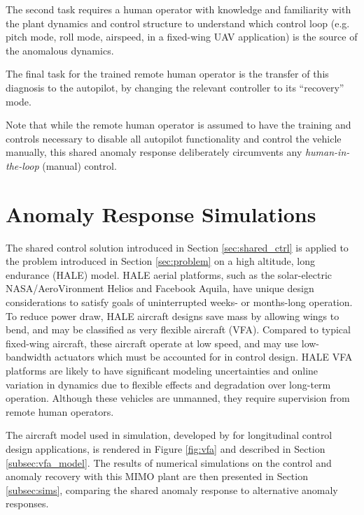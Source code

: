 \documentclass[english]{ifacconf}
\begin{document}
The second task requires a human operator with knowledge and familiarity with the plant dynamics and control structure to understand which control loop (e.g. pitch mode, roll mode, airspeed, in a fixed-wing UAV application) is the source of the anomalous dynamics. 

The final task for the trained remote human operator is the transfer of this diagnosis to the autopilot, by changing the relevant controller to its ``recovery'' mode.

Note that while the remote human operator is assumed to have the training and controls necessary to disable all autopilot functionality and control the vehicle manually, this shared anomaly response deliberately circumvents any \textit{human-in-the-loop} (manual) control. 

\section{Anomaly Response Simulations} \label{sec:vfa}
The shared control solution introduced in Section \ref{sec:shared_ctrl} is applied to the problem introduced in Section \ref{sec:problem} on a high altitude, long endurance (HALE) model. HALE aerial platforms, such as the solar-electric NASA/AeroVironment Helios and Facebook Aquila, have unique design considerations to satisfy goals of uninterrupted weeks- or months-long operation. To reduce power draw, HALE aircraft designs save mass by allowing wings to bend, and may be classified as very flexible aircraft (VFA). Compared to typical fixed-wing aircraft, these aircraft operate at low speed, and may use low-bandwidth actuators which must be accounted for in control design. HALE VFA platforms are likely to have significant modeling uncertainties and online variation in dynamics due to flexible effects and degradation over long-term operation. Although these vehicles are unmanned, they require supervision from remote human operators.

The aircraft model used in simulation, developed by \cite{gibson2011modeling} for longitudinal control design applications, is rendered in Figure \ref{fig:vfa} and described in Section \ref{subsec:vfa_model}. The results of numerical simulations on the control and anomaly recovery with this MIMO plant are then presented in Section \ref{subsec:sims}, comparing the shared anomaly response to alternative anomaly responses.
\end{document}
